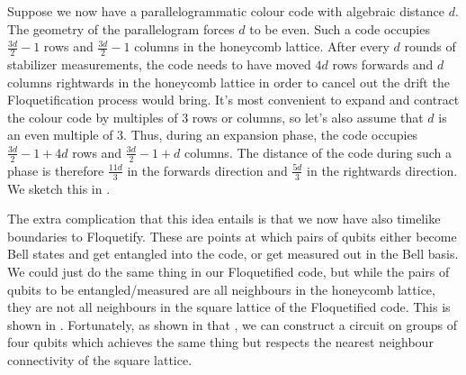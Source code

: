Suppose we now have a parallelogrammatic colour code with algebraic distance $d$.
The geometry of the parallelogram forces $d$ to be even.
Such a code occupies $\frac{3d}{2} - 1$ rows and $\frac{3d}{2} - 1$ columns in the honeycomb lattice.
After every $d$ rounds of stabilizer measurements,
the code needs to have moved $4d$ rows forwards and $d$ columns rightwards in the honeycomb lattice
in order to cancel out the drift the Floquetification process would bring.
It's most convenient to expand and contract the colour code by multiples of $3$ rows or columns,
so let's also assume that $d$ is an even multiple of $3$.
Thus, during an expansion phase, the code occupies $\frac{3d}{2} - 1 + 4d$ rows and $\frac{3d}{2} - 1 + d$ columns.
The distance of the code during such a phase is therefore
$\frac{11d}{3}$ in the forwards direction and $\frac{5d}{3}$ in the rightwards direction.
We sketch this in .

The extra complication that this idea entails is that we now have also timelike boundaries to Floquetify.
These are points at which pairs of qubits either become Bell states and get entangled into the code,
or get measured out in the Bell basis.
We could just do the same thing in our Floquetified code, but while the pairs of qubits to be entangled/measured
are all neighbours in the honeycomb lattice, they are not all neighbours in the square lattice of the Floquetified code.
This is shown in .
Fortunately, as shown in that ,
we can construct a circuit on groups of four qubits which achieves the same thing
but respects the nearest neighbour connectivity of the square lattice.
